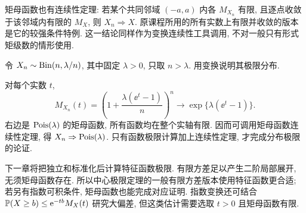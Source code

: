矩母函数也有连续性定理: 若某个共同邻域 $(-a,a)$ 内各 $M_{X_n}$ 有限, 且逐点收敛于该邻域内有限的 $M_X$, 则 $X_n\Rightarrow X$. 原课程所用的所有实数上有限并收敛的版本是它的较强条件特例. 这一结论同样作为变换连续性工具调用, 不对一般只有形式矩级数的情形使用.

\begin{example}
令 $X_n\sim\operatorname{Bin}(n,\lambda/n)$, 其中固定 $\lambda>0$, 只取 $n>\lambda$. 用变换说明其极限分布.
\end{example}
\begin{solution}
对每个实数 $t$,
\[M_{X_n}(t)=\left(1+\frac{\lambda(\ee^t-1)}n\right)^n
\longrightarrow\exp\{\lambda(\ee^t-1)\}.
\]
右边是 $\operatorname{Pois}(\lambda)$ 的矩母函数, 所有函数均在整个实轴有限. 因而可调用矩母函数连续性定理, 得 $X_n\Rightarrow\operatorname{Pois}(\lambda)$. 只有函数极限计算加上连续性定理, 才完成分布极限的论证.
\end{solution}
下一章将把独立和标准化后计算特征函数极限. 有限方差足以产生二阶局部展开, 无须矩母函数存在. 所以中心极限定理的一般有限方差版本使用特征函数更合适; 若另有指数可积条件, 矩母函数也能完成对应证明. 指数变换还可结合 $\mathbb P(X\ge b)\le\mathrm e^{-tb}M_X(t)$ 研究大偏差, 但这类估计需要选取 $t>0$ 且矩母函数有限.
